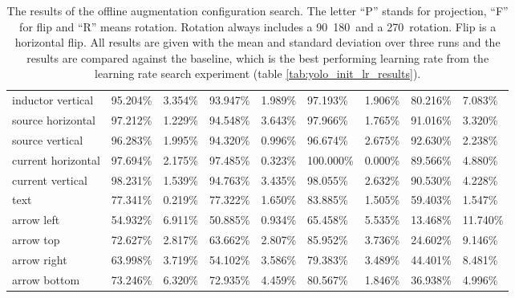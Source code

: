 \begin{table}[H]
\begin{center}
\begin{tabular}{|l|l|l|l|l|l|l|l|l|}
inductor vertical               & 95.204\% & 3.354\%  & 93.947\% & 1.989\%  &  97.193\%  & 1.906\% & 80.216\% & 7.083\%  \\
\rowcolor{lightgray!50}
source horizontal               & 97.212\% & 1.229\%  & 94.548\% & 3.643\%  &  97.966\%  & 1.765\% & 91.016\% & 3.320\%  \\
source vertical                 & 96.283\% & 1.995\%  & 94.320\% & 0.996\%  &  96.674\%  & 2.675\% & 92.630\% & 2.238\%  \\
\rowcolor{lightgray!50}
current horizontal              & 97.694\% & 2.175\%  & 97.485\% & 0.323\%  &  100.000\% & 0.000\% & 89.566\% & 4.880\%  \\
current vertical                & 98.231\% & 1.539\%  & 94.763\% & 3.435\%  &  98.055\%  & 2.632\% & 90.530\% & 4.228\%  \\
\rowcolor{lightgray!50}
text                            & 77.341\% & 0.219\%  & 77.322\% & 1.650\%  &  83.885\%  & 1.505\% & 59.403\% & 1.547\%  \\
arrow left                      & 54.932\% & 6.911\%  & 50.885\% & 0.934\%  &  65.458\%  & 5.535\% & 13.468\% & 11.740\% \\
\rowcolor{lightgray!50}
arrow top                       & 72.627\% & 2.817\%  & 63.662\% & 2.807\%  &  85.952\%  & 3.736\% & 24.602\% & 9.146\%  \\
arrow right                     & 63.998\% & 3.719\%  & 54.102\% & 3.586\%  &  79.383\%  & 3.489\% & 44.401\% & 8.481\%  \\
\rowcolor{lightgray!50}
arrow bottom                    & 73.246\% & 6.320\%  & 72.935\% & 4.459\%  &  80.567\%  & 1.846\% & 36.938\% & 4.996\%  \\
\hline

\end{tabular}
\caption{The results of the offline augmentation configuration search. The letter ``P'' stands for projection, ``F'' for flip and ``R'' means rotation. Rotation always includes a 90\textdegree\, 180\textdegree\ and a 270\textdegree\ rotation. Flip is a horizontal flip. All results are given with the mean and standard deviation over three runs and the results are compared against the baseline, which is the best performing learning rate from the learning rate search experiment (table \ref{tab:yolo_init_lr_results}).}
\label{tab:yolo_offline_aug_results}
\end{center}
\end{table}

